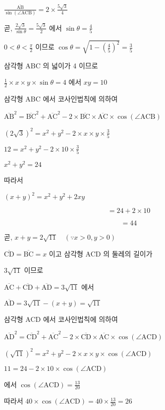 \documentclass[10pt]{article}
\begin{document}
\(\frac{\overline{\mathrm{AB}}}{\sin (\angle \mathrm{ACB})}=2 \times \frac{5 \sqrt{3}}{4}\)

곧, \(\frac{2 \sqrt{3}}{\sin \theta}=\frac{5 \sqrt{3}}{2}\) 에서 \(\sin \theta=\frac{4}{5}\)

\(0<\theta<\frac{\pi}{2}\) 이므로 \(\cos \theta=\sqrt{1-\left(\frac{4}{5}\right)^{2}}=\frac{3}{5}\)

삼각형 ABC 의 넓이가 4 이므로

\(\frac{1}{2} \times x \times y \times \sin \theta=4\) 에서 \(x y=10\)

삼각형 ABC 에서 코사인법칙에 의하여

\(\overline{\mathrm{AB}}^{2}=\overline{\mathrm{BC}}^{2}+\overline{\mathrm{AC}}^{2}-2 \times \overline{\mathrm{BC}} \times \overline{\mathrm{AC}} \times \cos (\angle \mathrm{ACB})\)

\((2 \sqrt{3})^{2}=x^{2}+y^{2}-2 \times x \times y \times \frac{3}{5}\)

\(12=x^{2}+y^{2}-2 \times 10 \times \frac{3}{5}\)

\(x^{2}+y^{2}=24\)

따라서

\((x+y)^{2}=x^{2}+y^{2}+2 x y\)

\[
=24+2 \times 10
\]

\[
=44
\]

곧, \(x+y=2 \sqrt{11} \quad(\because x>0, y>0)\)

\(\overline{\mathrm{CD}}=\overline{\mathrm{BC}}=x\) 이고 삼각형 ACD 의 둘레의 길이가

\(3 \sqrt{11}\) 이므로

\(\overline{\mathrm{AC}}+\overline{\mathrm{CD}}+\overline{\mathrm{AD}}=3 \sqrt{11}\) 에서

\(\overline{\mathrm{AD}}=3 \sqrt{11}-(x+y)=\sqrt{11}\)

삼각형 ACD 에서 코사인법칙에 의하여

\(\overline{\mathrm{AD}}^{2}=\overline{\mathrm{CD}}^{2}+\overline{\mathrm{AC}}^{2}-2 \times \overline{\mathrm{CD}} \times \overline{\mathrm{AC}} \times \cos (\angle \mathrm{ACD})\)

\((\sqrt{11})^{2}=x^{2}+y^{2}-2 \times x \times y \times \cos (\angle \mathrm{ACD})\)

\(11=24-2 \times 10 \times \cos (\angle \mathrm{ACD})\)

에서 \(\cos (\angle \mathrm{ACD})=\frac{13}{20}\)

따라서 \(40 \times \cos (\angle \mathrm{ACD})=40 \times \frac{13}{20}=26\)
\end{document}
